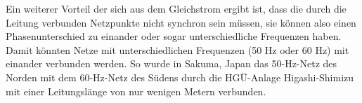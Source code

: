 Ein weiterer Vorteil der sich aus dem Gleichstrom ergibt ist, dass die durch die Leitung verbunden Netzpunkte nicht synchron sein müssen, sie können also einen Phasenunterschied zu einander oder sogar unterschiedliche Frequenzen haben. Damit könnten Netze mit unterschiedlichen Frequenzen (50 Hz oder 60 Hz) mit einander verbunden werden. So wurde in Sakuma, Japan das 50-Hz-Netz des Norden mit dem 60-Hz-Netz des Südens durch die HGÜ-Anlage Higashi-Shimizu mit einer Leitungslänge von nur wenigen Metern verbunden.\cite{Schymroch} %

